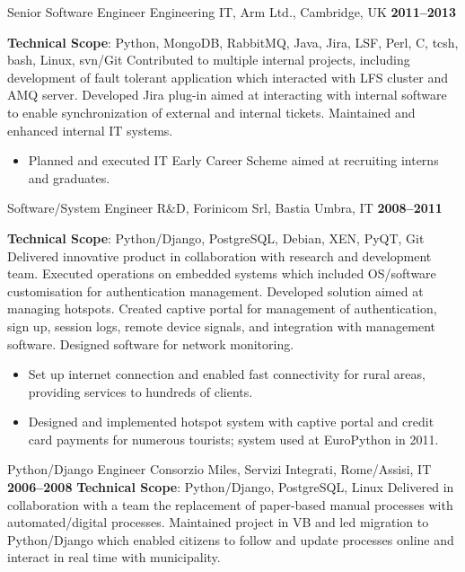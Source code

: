 \documentclass[10pt,a4paper,sans]{moderncv}
\begin{document}
\cventry{}
    {Senior Software Engineer}
    {Engineering IT, Arm Ltd., Cambridge, UK}
    {\textbf{2011--2013}}
    {}
    {\textbf{Technical Scope}: Python, MongoDB, RabbitMQ, Java, Jira, LSF,
    Perl, C, tcsh, bash, Linux, svn/Git\newline
    Contributed to multiple internal projects, including development of fault
    tolerant application which interacted with LFS cluster and AMQ server.
    Developed Jira plug-in aimed at interacting with internal software to
    enable synchronization of external and internal tickets. Maintained and
    enhanced internal IT systems.
    \begin{itemize}
        \item Planned and executed IT Early Career Scheme aimed at recruiting
            interns and graduates.
    \end{itemize}}

\cventry{}
    {Software/System Engineer}
    {R\&D, Forinicom Srl, Bastia Umbra, IT}
    {\textbf{2008--2011}}
    {}
    {\textbf{Technical Scope}: Python/Django, PostgreSQL, Debian, XEN, PyQT,
    Git\newline
    Delivered innovative product in collaboration with research and development
    team. Executed operations on embedded systems which included OS/software
    customisation for authentication management. Developed solution aimed at
    managing hotspots. Created captive portal for management of authentication,
    sign up, session logs, remote device signals, and integration with
    management software. Designed software for network monitoring.
    \begin{itemize}
        \item Set up internet connection and enabled fast connectivity for
            rural areas, providing services to hundreds of clients.
        \item Designed and implemented hotspot system with captive portal and
            credit card payments for numerous tourists; system used at
            EuroPython in 2011.
    \end{itemize}}

\cventry{}
    {Python/Django Engineer}
    {Consorzio Miles, Servizi Integrati, Rome/Assisi, IT}
    {\textbf{2006--2008}}
    {}
    {\textbf{Technical Scope}: Python/Django, PostgreSQL, Linux\newline
    Delivered in collaboration with a team the replacement of paper-based
    manual processes with automated/digital processes. Maintained project in
    VB and led migration to Python/Django which enabled citizens to follow and
    update processes online and interact in real time with municipality.}
\end{document}
